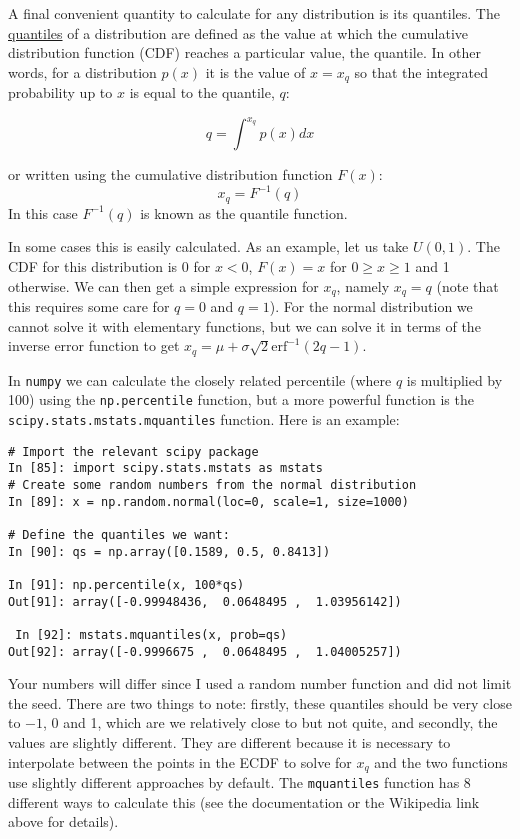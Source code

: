 \documentclass[a4paper,10pt]{article}
\newcommand{\link}[2]{{\color{blue}\href{#1}{#2}}}
\begin{document}
A final convenient quantity to calculate for any distribution is its quantiles. The \link{https://en.wikipedia.org/wiki/Quantile}{quantiles} of a distribution are defined as the value at which the cumulative distribution function (CDF) reaches a particular value, the quantile. In other words, for a distribution $p(x)$ it is the value of $x=x_q$ so that the integrated probability up to $x$ is equal to the quantile, $q$:

$$q = \int^{x_q} p(x) dx$$

or written using the cumulative distribution function $F(x)$:
$$x_q = F^{-1}(q)$$
In this case $F^{-1}(q)$ is known as the quantile function. 

In some cases this is easily calculated. As an example, let us take $U(0, 1)$. The CDF for this distribution is 0 for $x<0$, $F(x) = x$ for $0\ge x \ge 1$ and 1 otherwise. We can then get a simple expression for $x_q$, namely $x_q = q$ (note that this requires some care for $q=0$ and $q=1$). For the normal distribution we cannot solve it with elementary functions, but we can solve it in terms of the inverse error function to get $x_q = \mu + \sigma \sqrt{2}\mathrm{erf}^{-1}(2 q -1)$. 


In \texttt{numpy} we can calculate the closely related percentile (where $q$ is multiplied by 100) using the \texttt{np.percentile} function, but a more powerful function is the \texttt{scipy.stats.mstats.mquantiles} function. Here is an example:
\begin{lstlisting}
# Import the relevant scipy package
In [85]: import scipy.stats.mstats as mstats
# Create some random numbers from the normal distribution
In [89]: x = np.random.normal(loc=0, scale=1, size=1000)

# Define the quantiles we want:
In [90]: qs = np.array([0.1589, 0.5, 0.8413]) 

In [91]: np.percentile(x, 100*qs)
Out[91]: array([-0.99948436,  0.0648495 ,  1.03956142])

 In [92]: mstats.mquantiles(x, prob=qs) 
Out[92]: array([-0.9996675 ,  0.0648495 ,  1.04005257])
\end{lstlisting}


Your numbers will differ since I used a random number function and did not limit the seed. There are two things to note: firstly, these quantiles should be very close to $-1$, 0 and 1, which are we relatively close to but not quite, and secondly, the values are slightly different. They are different because it is necessary to interpolate between the points in the ECDF to solve for $x_q$ and the two functions use slightly different approaches by default. The \texttt{mquantiles} function has 8 different ways to calculate this (see the documentation or the Wikipedia link above for details).
\end{document}
